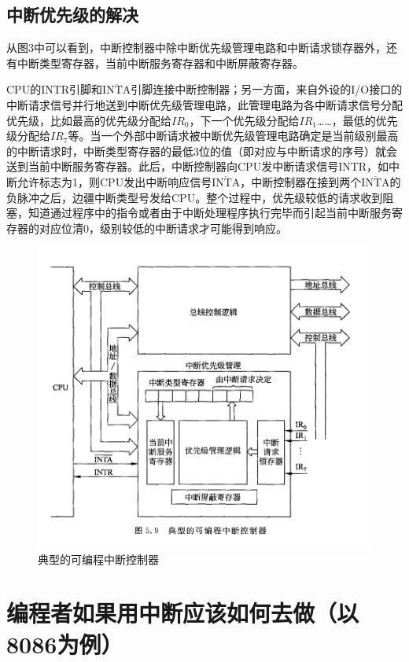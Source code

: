 \documentclass[UTF8]{ctexart}
\begin{document}
\subsection{中断优先级的解决}
从图3中可以看到，中断控制器中除中断优先级管理电路和中断请求锁存器外，还有中断类型寄存器，当前中断服务寄存器和中断屏蔽寄存器。\par
CPU的INTR引脚和$\overline{\mathrm{INTA}}$引脚连接中断控制器；另一方面，来自外设的I/O接口的中断请求信号并行地送到中断优先级管理电路，此管理电路为各中断请求信号分配优先级，比如最高的优先级分配给$IR_0$，下一个优先级分配给$IR_1$……，最低的优先级分配给$IR_7$等。当一个外部中断请求被中断优先级管理电路确定是当前级别最高的中断请求时，中断类型寄存器的最低3位的值（即对应与中断请求的序号）就会送到当前中断服务寄存器。此后，中断控制器向CPU发中断请求信号INTR，如中断允许标志为1，则CPU发出中断响应信号$\overline{\mathrm{INTA}}$，中断控制器在接到两个$\overline{\mathrm{INTA}}$的负脉冲之后，边疆中断类型号发给CPU。整个过程中，优先级较低的请求收到阻塞，知道通过程序中的指令或者由于中断处理程序执行完毕而引起当前中断服务寄存器的对应位清0，级别较低的中断请求才可能得到响应。
\begin{figure}[h]
	\centering
	\includegraphics[scale=0.7]{3.PNG}
    \caption{典型的可编程中断控制器}
\end{figure}
\section{编程者如果用中断应该如何去做（以8086为例）}
\end{document}

